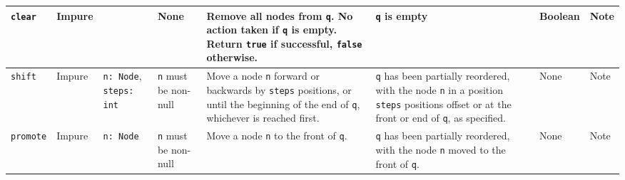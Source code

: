 \documentclass[10pt,letterpaper,final]{report}
\begin{document}
{\begin{center}
\begin{landscape}
\begin{xltabular}{\linewidth}{|l|l|X|X|X|X|X|X|}
          \verb|clear|     & Impure &                                   & None                                                          & Remove all nodes from \verb|q|. No action taken if \verb|q| is empty. Return \verb|true| if successful, \verb|false| otherwise.                                                                                                                                                                                                                                                         & \verb|q| is empty                                                                                  & Boolean  & Note                                                                                                                                                            \\ \hline
          \verb|shift|     & Impure & \verb|n: Node|, \verb|steps: int| & \verb|n| must be non-null                                     & Move a node \verb|n| forward or backwards by \verb|steps| positions, or until the beginning of the end of \verb|q|, whichever is reached first.                                                                                                                                                                               & \verb|q| has been partially reordered, with the node \verb|n| in a position \verb|steps| positions offset or at the front or end of \verb|q|, as specified.  & None     & Note                                                                                                                                                            \\ \hline
          \verb|promote|   & Impure & \verb|n: Node|                    & \verb|n| must be non-null                                     & Move a node \verb|n| to the front of \verb|q|.                                                                                                                                                                                                                                                                                & \verb|q| has been partially reordered, with the node \verb|n| moved to the front of \verb|q|.                                                                & None     & Note                                                                                                                                                            \\ \hline

\end{xltabular}
\end{landscape}
\end{center}}
\end{document}
